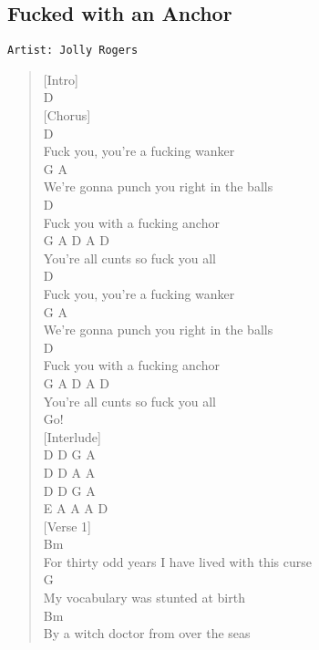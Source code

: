 \documentclass[11pt]{article}
\begin{document}
\subsection{Fucked with an Anchor}
\label{sec:orga0c4864}
\begin{verbatim}
Artist: Jolly Rogers
\end{verbatim}
\begin{verse}
[Intro]\\
D\\
\vspace*{1em}
[Chorus]\\
D\\
Fuck you, you're a fucking wanker\\
G                      A\\
We're gonna punch you right in the balls\\
D\\
Fuck you with a fucking anchor\\
G           A        D    A   D\\
You're all cunts so fuck you all\\
D\\
Fuck you, you're a fucking wanker\\
G                      A\\
We're gonna punch you right in the balls\\
D\\
Fuck you with a fucking anchor\\
G           A        D    A   D\\
You're all cunts so fuck you all\\
Go!\\
\vspace*{1em}
[Interlude]\\
D D G A\\
D D A A\\
D D G A\\
E A  A A D\\
\vspace*{1em}
[Verse 1]\\
Bm\\
For thirty odd years I have lived with this curse\\
\hspace*{3em}G\\
My vocabulary was stunted at birth\\
\hspace*{3em}Bm\\
By a witch doctor from over the seas\\

\end{verse}
\end{document}
